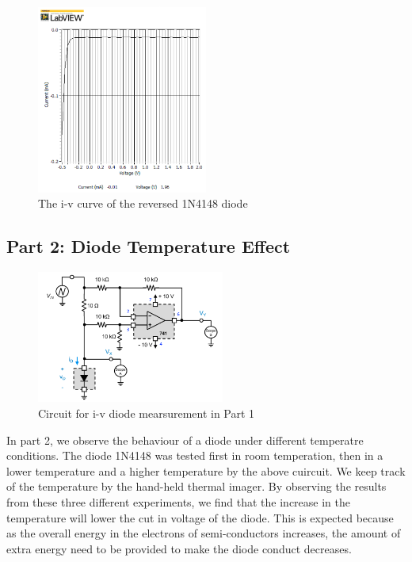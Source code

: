 \documentclass[letterpaper, 10 pt, conference]{ieeeconf}  %
\begin{document}
	\begin{figure}[h]
        \centering
        \includegraphics[width=0.5\textwidth]{images/result6.png}
        \caption{The i-v curve of the reversed 1N4148 diode}
    \end{figure}
    \subsection{Part 2: Diode Temperature Effect}
	\begin{figure}[h]
        \centering
        \includegraphics[width=0.55\textwidth]{images/Part1circuit.png}
        \caption{Circuit for i-v diode mearsurement in Part 1}
    \end{figure}
    In part 2, we observe the behaviour of a diode under different temperatre conditions. The diode 1N4148 was tested first in room temperation, then in a lower temperature and a higher temperature by the above cuircuit. We keep track of the temperature by the hand-held thermal imager. \newline
	By observing the results from these three different experiments, we find that the increase in the temperature will lower the cut in voltage of the diode. This is expected because as the overall energy in the electrons of semi-conductors increases, the amount of extra energy need to be provided to make the diode conduct decreases.\newline
\end{document}
